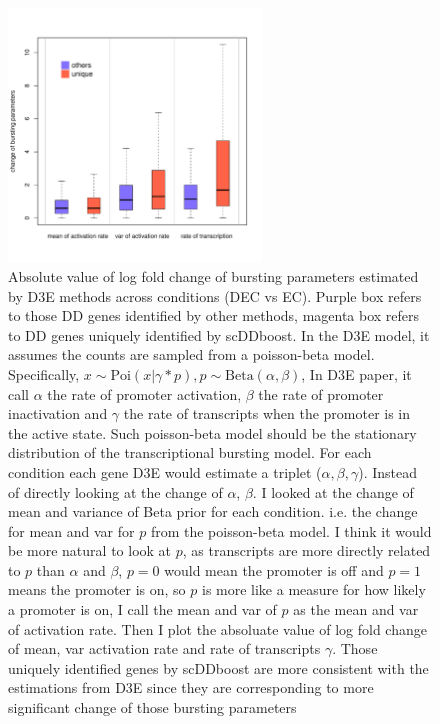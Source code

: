 \documentclass[aoas,preprint]{imsart}
\begin{document}
\begin{figure}[H]
\includegraphics[width = 0.6\textwidth]{Figs/D3E_box.pdf}
\caption{ Absolute value of log fold change of bursting parameters estimated by D3E methods across conditions (DEC vs EC). Purple box refers to those DD genes identified by other methods, magenta box refers to DD genes uniquely identified by scDDboost. 
In the D3E model, it assumes the counts are sampled from a poisson-beta model. Specifically,  $x \sim \text{Poi}(x | \gamma * p), p \sim \text{Beta}(\alpha,\beta)$, In D3E paper, it call $\alpha$ the rate of promoter activation, $\beta$ the rate of promoter inactivation 
and $\gamma$ the rate of transcripts when the promoter is in the active state.  Such poisson-beta model should be the stationary distribution of the transcriptional bursting model.
For each condition each gene D3E would estimate a triplet ($\alpha, \beta,\gamma$).
 Instead of directly looking at the change of $\alpha$, $\beta$. I looked at the change of mean and variance of Beta prior for each condition.
 i.e. the change for mean and var for $p$ from the poisson-beta model. I think it would be more natural to look at $p$, as transcripts are more directly related to $p$ than $\alpha$ and $\beta$, 
 $p = 0$ would mean the promoter is off and $p = 1$ means the promoter is on, so $p$ is more like a measure for how likely a promoter is on, I call the mean and var of $p$ as the mean and var of activation rate.
 Then I plot the absoluate value of log fold change of mean, var activation rate and rate of transcripts $\gamma$. 
 Those uniquely identified genes by scDDboost are more consistent with the estimations from D3E since they are corresponding to more significant change of those bursting parameters}
\end{figure}
\end{document}
